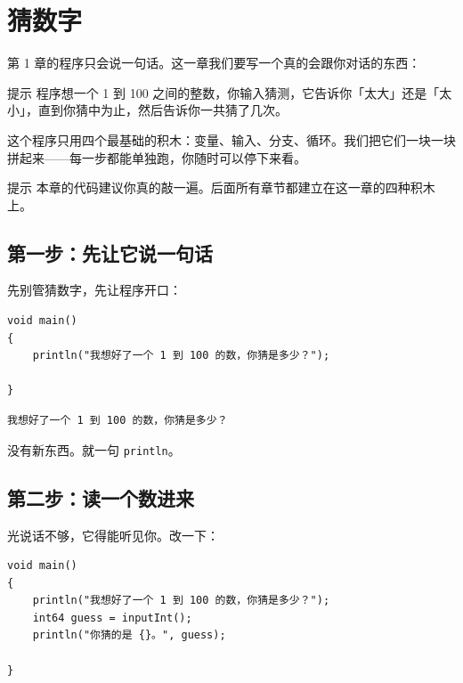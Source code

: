 \chapter{猜数字}
\label{ch:02}

第 1 章的程序只会说一句话。这一章我们要写一个真的会跟你对话的东西：

\begin{tip}{提示}
程序想一个 1 到 100 之间的整数，你输入猜测，它告诉你「太大」还是「太小」，直到你猜中为止，然后告诉你一共猜了几次。
\end{tip}

这个程序只用四个最基础的积木：变量、输入、分支、循环。我们把它们一块一块拼起来——每一步都能单独跑，你随时可以停下来看。

\begin{tip}{提示}
本章的代码建议你真的敲一遍。后面所有章节都建立在这一章的四种积木上。
\end{tip}

\section{第一步：先让它说一句话}

先别管猜数字，先让程序开口：

\par
\medskip
\begin{lstlisting}[style=chali]
void main()
{
    println("我想好了一个 1 到 100 的数，你猜是多少？");

}
\end{lstlisting}
\par
\medskip

\par
\medskip
\begin{lstlisting}[style=out]
我想好了一个 1 到 100 的数，你猜是多少？
\end{lstlisting}
\par
\medskip

没有新东西。就一句 \texttt{println}。

\section{第二步：读一个数进来}

光说话不够，它得能听见你。改一下：

\par
\medskip
\begin{lstlisting}[style=chali]
void main()
{
    println("我想好了一个 1 到 100 的数，你猜是多少？");
    int64 guess = inputInt();
    println("你猜的是 {}。", guess);

}
\end{lstlisting}
\par
\medskip

